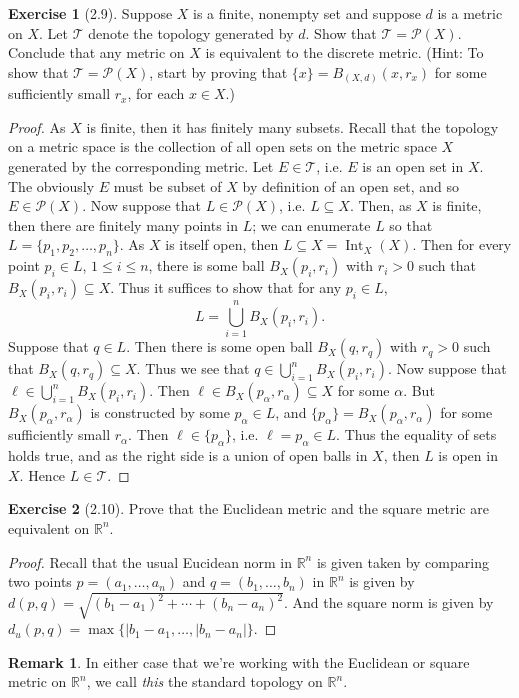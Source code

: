 \documentclass[9pt,reqno]{amsart}
\theoremstyle{definition}
\newtheorem{exercise}{Exercise}[section]
\newtheorem{rem}{Remark}[section]
\DeclareMathOperator{\Int}{Int}
\newcommand{\rr}{\mathbb R}
\begin{document}
\begin{exercise}[2.9]
	Suppose $X$ is a finite, nonempty set and suppose $d$ is a metric on $X$. Let $\mathcal T$ denote the topology generated by $d$. Show that $\mathcal T = \mathcal P(X)$. Conclude that any metric on $X$ is equivalent to the discrete metric. (Hint: To show that $\mathcal T = \mathcal P(X)$, start by proving that $\{x \} = B_{(X,d)} (x, r_x)$ for some sufficiently small $r_x$, for each $x \in X$.)
\end{exercise}
\begin{proof} As $X$ is finite, then it has finitely many subsets. Recall that the topology on a metric space is the collection of all open sets on the metric space $X$ generated by the corresponding metric. Let $E \in \mathcal T$, i.e. $E$ is an open set in $X$. The obviously $E$ must be subset of $X$ by definition of an open set, and so $E \in \mathcal P(X)$. Now suppose that $L \in \mathcal P (X)$, i.e. $L \subseteq X$. Then, as $X$ is finite, then there are finitely many points in $L$; we can enumerate $L$ so that $L = \{p_1, p_2, \ldots, p_n \}$. As $X$ is itself open, then $L \subseteq X = \Int_X(X)$. Then for every point $p_i \in L$, $1 \leq i \leq n$, there is some ball $B_X(p_i, r_i)$ with $r_i > 0$ such that $B_X(p_i, r_i) \subseteq X$. Thus it suffices to show that for any $p_i \in L$, \[ L = \bigcup _{i = 1}^n B_X(p_i, r_i).\] Suppose that $q \in L$. Then there is some open ball $B_X(q, r_q)$ with $r_q > 0$ such that $B_X(q, r_q) \subseteq X$. Thus we see that $q \in \bigcup_{i =1}^n B_X(p_i, r_i)$. Now suppose that $\ell \in \bigcup_{i =1}^n B_X(p_i, r_i)$. Then $\ell \in B_X(p_\alpha, r_\alpha) \subseteq X$ for some $\alpha$. But $B_X(p_\alpha, r_\alpha)$ is constructed by some $p_\alpha \in L$, and $\{p_\alpha \} = B_X(p_\alpha, r_\alpha)$ for some sufficiently small $r_\alpha$. Then $\ell \in \{p_\alpha \}$, i.e. $\ell = p_\alpha \in L$. Thus the equality of sets holds true, and as the right side is a union of open balls in $X$, then $L$ is open in $X$. Hence $L \in \mathcal T$. 
\end{proof}
\begin{exercise}[2.10] Prove that the Euclidean metric and the square metric are equivalent on $\rr^n$.
\end{exercise}
\begin{proof} Recall that the usual Eucidean norm in $\rr^n$ is given taken by comparing two points $p = (a_1, \ldots, a_n)$ and $q = (b_1, \ldots, b_n)$ in $\rr^n$ is given by $d(p,q) = \sqrt{(b_1 - a_1)^2 + \cdots + (b_n - a_n)^2}$. And the square norm is given by $d_u (p,q ) = \max \{ |b_1 - a_1, \ldots, |b_n - a_n | \}$.
	
\end{proof}
\begin{rem}
	In either case that we're working with the Euclidean or square metric on $\rr^n$, we call \textit{this} the standard topology on $\rr^n$.
\end{rem}
\end{document}

